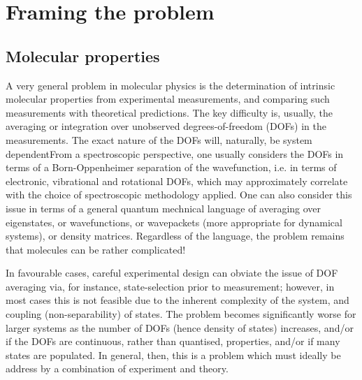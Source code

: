 \section{Framing the problem}

\subsection{Molecular properties}
A very general problem in molecular physics is the determination of intrinsic molecular properties from experimental measurements, and comparing such measurements with theoretical predictions. The key difficulty is, usually, the averaging or integration over unobserved degrees-of-freedom (DOFs) in the measurements. The exact nature of the DOFs will, naturally, be system dependentFrom a spectroscopic perspective, one usually considers the DOFs in terms of a Born-Oppenheimer separation of the wavefunction, i.e. in terms of electronic, vibrational and rotational DOFs, which may approximately correlate with the choice of spectroscopic methodology applied. One can also consider this issue in terms of a general quantum mechnical language of averaging over eigenstates, or wavefunctions, or wavepackets (more appropriate for dynamical systems), or density matrices. Regardless of the language, the problem remains that molecules can be rather complicated!

In favourable cases, careful experimental design can obviate the issue of DOF averaging via, for instance, state-selection prior to measurement; however, in most cases this is not feasible due to the inherent complexity of the system, and coupling (non-separability) of states. The problem becomes significantly worse for larger systems as the number of DOFs (hence density of states) increases, and/or if the DOFs are continuous, rather than quantised, properties, and/or if many states are populated. In general, then, this is a problem which must ideally be address by a combination of experiment and theory.